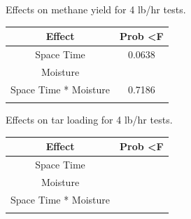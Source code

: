 \documentclass[11pt,twocolumn]{article}
\begin{document}
\begin{minipage}{\textwidth}
	\centering
	\caption{Effects on methane yield for 4 lb/hr tests.}
	\label{tar4}
	\begin{tabular}{c c}
	\toprule
	Effect				&	Prob \textless F	\\
	\midrule
	Space Time			&	0.0638 \\
	Moisture				&	\color{red}{0.0277} \\
	Space Time * Moisture	&	0.7186 \\
	\bottomrule
	{}	&	{}	\\
	\end{tabular}

	\centering
	\caption{Effects on tar loading for 4 lb/hr tests.}
	\label{tar4}
	\begin{tabular}{c c}
	\toprule
	Effect				&	Prob \textless F	\\
	\midrule
	Space Time			&	\color{red}{0.0024} \\
	Moisture				&	\color{red}{ 0.0110} \\
	Space Time * Moisture	&	\color{red}{0.0170}  \\
	\bottomrule
	{}	&	{}	\\
	\end{tabular}

\end{minipage}
\end{document}
